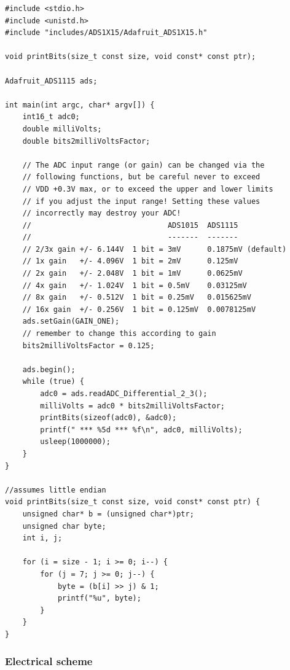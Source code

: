\begin{code}
  \label{code:implementation:sec:devices:subsec:1-5V:example}
  \begin{verbatim}
#include <stdio.h>
#include <unistd.h>
#include "includes/ADS1X15/Adafruit_ADS1X15.h"

void printBits(size_t const size, void const* const ptr);

Adafruit_ADS1115 ads;

int main(int argc, char* argv[]) {
    int16_t adc0;
    double milliVolts;
    double bits2milliVoltsFactor;

    // The ADC input range (or gain) can be changed via the
    // following functions, but be careful never to exceed
    // VDD +0.3V max, or to exceed the upper and lower limits
    // if you adjust the input range! Setting these values
    // incorrectly may destroy your ADC!
    //                               ADS1015  ADS1115
    //                               -------  -------
    // 2/3x gain +/- 6.144V  1 bit = 3mV      0.1875mV (default)
    // 1x gain   +/- 4.096V  1 bit = 2mV      0.125mV
    // 2x gain   +/- 2.048V  1 bit = 1mV      0.0625mV
    // 4x gain   +/- 1.024V  1 bit = 0.5mV    0.03125mV
    // 8x gain   +/- 0.512V  1 bit = 0.25mV   0.015625mV
    // 16x gain  +/- 0.256V  1 bit = 0.125mV  0.0078125mV
    ads.setGain(GAIN_ONE);
    // remember to change this according to gain
    bits2milliVoltsFactor = 0.125;

    ads.begin();
    while (true) {
        adc0 = ads.readADC_Differential_2_3();
        milliVolts = adc0 * bits2milliVoltsFactor;
        printBits(sizeof(adc0), &adc0);
        printf(" *** %5d *** %f\n", adc0, milliVolts);
        usleep(1000000);
    }
}

//assumes little endian
void printBits(size_t const size, void const* const ptr) {
    unsigned char* b = (unsigned char*)ptr;
    unsigned char byte;
    int i, j;

    for (i = size - 1; i >= 0; i--) {
        for (j = 7; j >= 0; j--) {
            byte = (b[i] >> j) & 1;
            printf("%u", byte);
        }
    }
}
  \end{verbatim}
\end{code}

\subsubsection{Electrical scheme}
\label{ch:implementation:sec:devices:subsec:1-5V:electrical-scheme}


